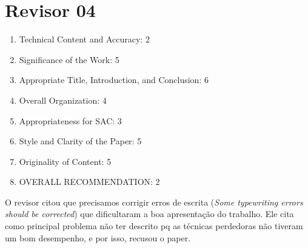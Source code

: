 \section{Revisor 04}
\begin{frame}
	\begin{enumerate}
		\item Technical Content and Accuracy: 2
		\item Significance of the Work: 5
		\item Appropriate Title, Introduction, and Conclusion: 6
		\item Overall Organization: 4
		\item Appropriateness for SAC: 3
		\item Style and Clarity of the Paper: 5
		\item Originality of Content: 5
		\item OVERALL RECOMMENDATION: 2
	\end{enumerate}
	O revisor citou que precisamos corrigir erros de escrita (\emph{Some typewriting errors should be corrected}) que dificultaram a boa apresentação do trabalho. Ele cita como principal problema não ter descrito pq as técnicas perdedoras não tiveram um bom desempenho, e por isso, recusou o paper.
\end{frame}
